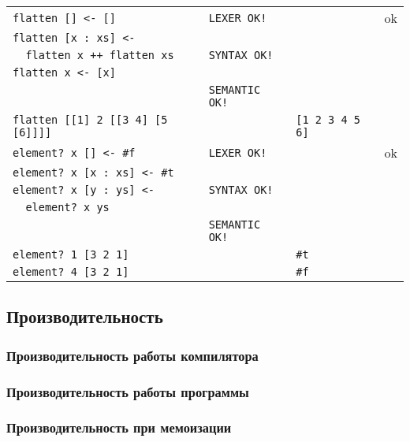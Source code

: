 \begin{longtable}[ht!]{|l|l|l|c|}
            \verb,flatten [] <- [],         & \verb,LEXER OK!,   &                 & ok \\
            \verb,flatten [x : xs] <- ,     &                    &                 & \\
            \verb,  flatten x ++ flatten xs,& \verb,SYNTAX OK!,  &                 & \\
            \verb,flatten x <- [x],         &                    &                 & \\
                                            & \verb,SEMANTIC OK!,&                 & \\
            \verb,flatten [[1] 2 [[3 4] [5 [6]]]],&              & \verb,[1 2 3 4 5 6],& \\ \hline

            \verb,element? x [] <- #f,      & \verb,LEXER OK!,   &                 & ok \\
            \verb,element? x [x : xs] <- #t,&                    &                 & \\
            \verb,element? x [y : ys] <-,   & \verb,SYNTAX OK!,  &                 & \\
            \verb,  element? x ys,          &                    &                 & \\
                                            & \verb,SEMANTIC OK!,&                 & \\
            \verb,element? 1 [3 2 1],       &                    & \verb,#t,       & \\
            \verb,element? 4 [3 2 1],       &                    & \verb,#f,       & \\ \hline
    \end{longtable}

    \subsection{Производительность}
        \subsubsection{Производительность работы компилятора}
        \subsubsection{Производительность работы программы}
        \subsubsection{Производительность при мемоизации}

